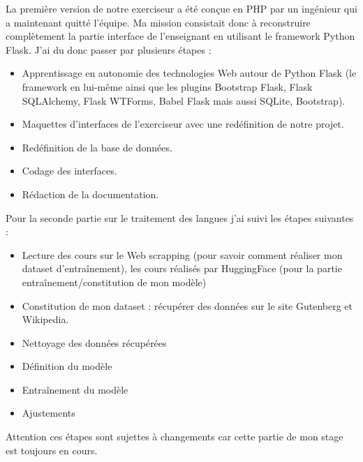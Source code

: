 \documentclass[12pt]{article}
\begin{document}
La première version de notre exerciseur a été conçue en PHP par un ingénieur qui a maintenant quitté l’équipe. Ma mission consistait donc à reconstruire complètement la partie interface de l’enseignant en utilisant le framework Python Flask. J’ai du donc passer par plusieurs étapes : 

\begin{itemize}


    \item Apprentissage en autonomie des technologies Web autour de Python Flask (le framework en lui-même ainsi que les plugins Bootstrap Flask, Flask SQLAlchemy, Flask WTForms, Babel Flask mais aussi SQLite, Bootstrap).
    
    \item Maquettes d'interfaces de l’exerciseur avec une redéfinition de notre projet.
    
    \item Redéfinition de la base de données. 
    
    \item Codage des interfaces.
    
    \item Rédaction de la documentation.
    
\end{itemize}

Pour la seconde partie sur le traitement des langues j'ai suivi les étapes suivantes :

\begin{itemize}
    \item Lecture des cours sur le Web scrapping (pour savoir comment réaliser mon dataset d'entraînement), les cours réalisés par HuggingFace (pour la partie entraînement/constitution de mon modèle)
    
    \item Constitution de mon dataset : récupérer des données sur le site Gutenberg et Wikipedia.
    
    \item Nettoyage des données récupérées
    
    \item Définition du modèle
    
    \item Entraînement du modèle
    
    \item Ajustements 
\end{itemize}

Attention ces étapes sont sujettes à changements car cette partie de mon stage est toujours en cours.
\end{document}
